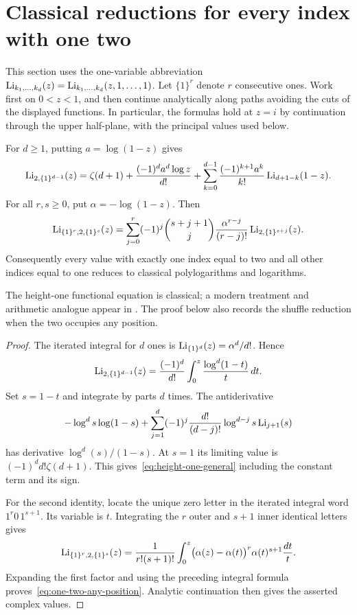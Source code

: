 \section{Classical reductions for every index with one two}
\label{sec:one-two}

This section uses the one-variable abbreviation
$\operatorname{Li}_{k_1,\ldots,k_d}(z)=\operatorname{Li}_{k_1,\ldots,k_d}(z,1,\ldots,1)$.
Let $\{1\}^{r}$ denote $r$ consecutive ones. Work first on $0<z<1$, and
then continue analytically along paths avoiding the cuts of the displayed
functions. In particular, the formulas hold at $z=i$ by continuation
through the upper half-plane, with the principal values used below.

\begin{theorem}\label{thm:one-two}
For $d\ge1$, putting $a=\log(1-z)$ gives
\begin{equation}\label{eq:height-one-general}
 \operatorname{Li}_{2,\{1\}^{d-1}}(z)
 =\zeta(d+1)+\frac{(-1)^d a^d\log z}{d!}
   +\sum_{k=0}^{d-1}\frac{(-1)^{k+1}a^k}{k!}
                       \operatorname{Li}_{d+1-k}(1-z).
\end{equation}
For all $r,s\ge0$, put $\alpha=-\log(1-z)$. Then
\begin{equation}\label{eq:one-two-any-position}
 \operatorname{Li}_{\{1\}^{r},2,\{1\}^{s}}(z)
 =\sum_{j=0}^{r}(-1)^j\binom{s+j+1}{j}
      \frac{\alpha^{r-j}}{(r-j)!}
                     \operatorname{Li}_{2,\{1\}^{s+j}}(z).
\end{equation}
Consequently every value with exactly one index equal to two and all other
indices equal to one reduces to classical polylogarithms and logarithms.
\end{theorem}

The height-one functional equation is classical; a modern treatment and
arithmetic analogue appear in \cite{NakamuraShiraishi}. The proof below
also records the shuffle reduction when the two occupies any position.

\begin{proof}
The iterated integral for $d$ ones is
$\operatorname{Li}_{\{1\}^{d}}(z)=\alpha^d/d!$. Hence
\[
 \operatorname{Li}_{2,\{1\}^{d-1}}(z)
 =\frac{(-1)^d}{d!}\int_0^z\frac{\log^d(1-t)}{t}\,dt.
\]
Set $s=1-t$ and integrate by parts $d$ times. The antiderivative
\[
 -\log^d s\log(1-s)
  +\sum_{j=1}^{d}(-1)^j\frac{d!}{(d-j)!}
                       \log^{d-j}s\operatorname{Li}_{j+1}(s)
\]
has derivative $\log^d(s)/(1-s)$. At $s=1$ its limiting value is
$(-1)^d d!\zeta(d+1)$. This gives~\eqref{eq:height-one-general} including
the constant term and its sign.

For the second identity, locate the unique zero letter in the iterated
integral word $1^r0\,1^{s+1}$. Its variable is $t$. Integrating the
$r$ outer and $s+1$ inner identical letters gives
\[
 \operatorname{Li}_{\{1\}^{r},2,\{1\}^{s}}(z)
 =\frac1{r!(s+1)!}\int_0^z
    \bigl(\alpha(z)-\alpha(t)\bigr)^r\alpha(t)^{s+1}\frac{dt}{t}.
\]
Expanding the first factor and using the preceding integral formula
proves~\eqref{eq:one-two-any-position}. Analytic continuation then gives
the asserted complex values.
\end{proof}

